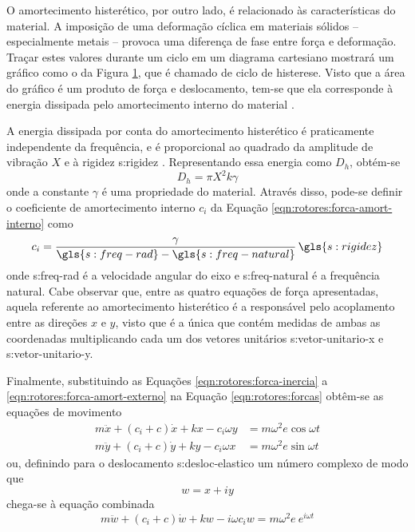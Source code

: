\documentclass[12pt,openright,oneside,a4paper,
	chapter=TITLE,section=TITLE,
	english,brazil]{abntex2}
\begin{document}
	O amortecimento histerético, por outro lado, é relacionado às características do material. A imposição de uma deformação cíclica em materiais sólidos -- especialmente metais -- provoca uma diferença de fase entre força e deformação. Traçar estes valores durante um ciclo em um diagrama cartesiano mostrará um gráfico como o da Figura \ref{fig:histerese}, que é chamado de ciclo de histerese. Visto que a área do gráfico é um produto de força e deslocamento, tem-se que ela corresponde à energia dissipada pelo amortecimento interno do material \cite{dimarogonas:1995}. 
	\begin{figure}[b]
		\label{fig:histerese}
	\end{figure}

	A energia dissipada por conta do amortecimento histerético é praticamente independente da frequência, e é proporcional ao quadrado da amplitude de vibração $ X $ e à rigidez \gls{s:rigidez} \cite{dimarogonas:1995}. Representando essa energia como $ D_h $, obtém-se
	\begin{equation}
		D_h = \pi X^2k\gamma
	\end{equation}
	onde a constante $ \gamma $ é uma propriedade do material. Através disso, pode-se definir o coeficiente de amortecimento interno $ c_i $ da Equação \ref{eqn:rotores:forca-amort-interno} como \cite{dimarogonas:1995}
	\begin{equation}
		c_i = \frac{\gamma}{\gls{s:freq-rad} - \gls{s:freq-natural}}\,\gls{s:rigidez}
	\end{equation}
	onde \gls{s:freq-rad} é a velocidade angular do eixo e \gls{s:freq-natural} é a frequência natural. Cabe observar que, entre as quatro equações de força apresentadas, aquela referente ao amortecimento histerético é a responsável pelo acoplamento entre as direções $ x $ e $ y $, visto que é a única que contém medidas de ambas as coordenadas multiplicando cada um dos vetores unitários \gls{s:vetor-unitario-x} e \gls{s:vetor-unitario-y}.
	
	Finalmente, substituindo as Equações \ref{eqn:rotores:forca-inercia} a \ref{eqn:rotores:forca-amort-externo} na Equação \ref{eqn:rotores:forcas} obtêm-se as equações de movimento \cite{rao:2008}
	\begin{align}
		m\ddot{x} + (c_i + c)\dot{x} + kx - c_i\omega y &= m\omega^2\mathit{e}\cos\omega t \\
		m\ddot{y} + (c_i + c)\dot{y} + ky - c_i\omega x &= m\omega^2\mathit{e}\sin\omega t
	\end{align}
	ou, definindo para o deslocamento \gls{s:desloc-elastico} um número complexo de modo que \[ w = x + iy \] chega-se à equação combinada
	\begin{equation}\label{eqn:rotores:resposta-rodopio}
		m\ddot{w} + (c_i + c)\dot{w} + kw - i\omega c_i w = m\omega^2 \mathit{e}\ e^{i\omega t}
	\end{equation}
	
\end{document}
